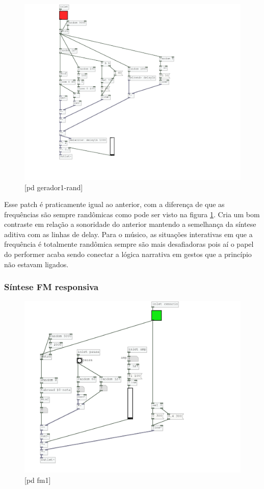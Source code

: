 \documentclass[draft]{ppgmus}
\begin{document}
\begin{figure}
\includegraphics[scale=.6]{gerador-sintese1-rand}
\caption{[pd gerador1-rand]}
\label{gerador1rand}
\end{figure}

Esse patch é praticamente igual ao anterior, com a diferença de que as frequências
são sempre randômicas como pode ser visto na figura \ref{gerador1rand}. Cria um bom contraste 
em relação a sonoridade do anterior mantendo a semelhança da síntese aditiva com as linhas de delay. 
Para o músico, as situações interativas em que a frequência é totalmente randômica sempre são mais
desafiadoras pois aí o papel do performer acaba sendo conectar a lógica narrativa em gestos que a
princípio não estavam ligados.


\subsubsection{Síntese FM responsiva}

\begin{figure}
\includegraphics[scale=.6]{gerador-sintese-fm}
\caption{[pd fm1]}
\label{geradorfm}
\end{figure}
\end{document}
